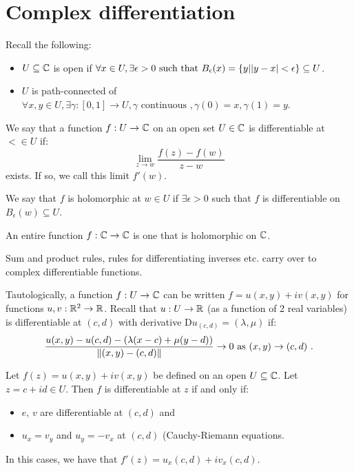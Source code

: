 
\section{Complex differentiation}
\label{sec:1}

Recall the following:
\begin{itemize}
\item  $U \subseteq \mathbb{C}$ is open if $\forall x \in U, \exists \epsilon > 0 \text{ such that } B_\epsilon(x) = \{ y | \lvert y-x\rvert < \epsilon \}  \subseteq U$.
\item $U$ is path-connected of $\forall x, y \in U, \exists \gamma : [0, 1] \rightarrow U, \gamma \text{ continuous }, \gamma(0) = x, \gamma(1) = y$.
\end{itemize}

\begin{definition}
  We say that a function $f : U \rightarrow \mathbb{C}$ on an open set $U \in \mathbb{C}$ is differentiable at $< \in U$ if:
\[
\lim_{z\rightarrow w} \frac{f(z) - f(w)}{z - w}
\]
exists. If so, we call this limit $f'(w)$.

 We say that $f$ is holomorphic at $w \in U$ if $\exists \epsilon > 0$ such that $f$ is differentiable on $B_\epsilon(w) \subseteq U$.
\end{definition}

\begin{definition}
  An entire function $f : \mathbb{C} \rightarrow \mathbb{C}$ is one that is holomorphic on $\mathbb{C}$.
\end{definition}

\begin{remark}
  Sum and product rules, rules for differentiating inverses etc. carry over to complex differentiable functions.
\end{remark}

Tautologically, a function $f : U \rightarrow \mathbb{C}$ can be written $f = u(x, y) + iv(x, y)$ for functions $u, v : \mathbb{R}^2 \rightarrow \mathbb{R}$. Recall that $u : U \rightarrow \mathbb{R}$ (as a function of 2 real variables) is differentiable at $(c, d)$ with derivative $\mathrm{D}u_{(c, d)} = (\lambda, \mu)$ if:
\[
\frac{u(x, y) - u(c, d) - \left(\lambda(x - c) + \mu(y - d)\right)}{\lVert(x, y) - (c, d)\rVert} \rightarrow 0 \text{ as } (x, y) \rightarrow (c, d)\ \text{.}
\]

\begin{proposition}
  Let $f(z) = u(x, y) + iv(x, y)$ be defined on an open $U \subseteq \mathbb{C}$. Let $z = c+id \in U$. Then $f$ is differentiable at $z$ if and only if:
  \begin{itemize}
  \item $e$, $v$ are differentiable at $(c, d)$ and
  \item $u_x = v_y$ and $u_y = -v_x$ at $(c, d)$ (Cauchy-Riemann equations.
  \end{itemize}
In this cases, we have that $f'(z) = u_x(c, d) + iv_x(c, d)$.
\end{proposition}

